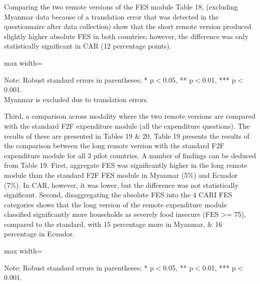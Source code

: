 \documentclass[11pt,harvard]{article}
\begin{document}
Comparing the two remote versions of the FES module Table 18, (excluding Myanmar data because of a translation error that was detected in the questionnaire after data collection) show that the short remote version produced slightly higher absolute FES in both countries; however, the difference was only statistically significant in CAR (12 percentage points).
	
	\begin{table}[htbp]
		\centering
		\begin{adjustbox}{max width=\textwidth}
			\begin{threeparttable}
				\caption{Impact of Module Length on Expenditure and FES in Remote Surveys}
				\scriptsize
				 
				\label{tab:FES_RM_Form_Length_ECU_CAR}
				\begin{tablenotes}
					\item Note: Robust standard errors in parentheses; * p$<$0.05, ** p$<$0.01, *** p$<$0.001. \\
					Myanmar is excluded due to translation errors.
				\end{tablenotes}
			\end{threeparttable}
		\end{adjustbox}
	\end{table}
	
Third, a comparison across modality where the two remote versions are compared with the standard F2F expenditure module (all the expenditure questions). The results of these are presented in Tables 19 \& 20. Table 19 presents the results of the comparison between the long remote version with the standard F2F expenditure module for all 3 pilot countries. A number of findings can be deduced from Table 19. First, aggregate FES was significantly higher in the long remote module than the standard F2F FES module in Myanmar (5\%) and Ecuador (7\%). In CAR, however,  it was lower, but the difference was not statistically significant. Second, disaggregating the absolute FES into the 4 CARI FES categories shows that the long version of the remote expenditure module classified significantly more households as severely food insecure (FES >= 75), compared to the standard, with 15 percentage more in Myanmar, \& 16 percentage in Ecuador. 
	
	\begin{table}[htbp]
		\centering
		\begin{adjustbox}{max width=\textwidth}
			\begin{threeparttable}
				\caption{Impact of Module Length on Expenditure and FES: F2F vs. Remote Long}
				\scriptsize
				 
				\label{tab:FES_F2F_Long_All_Country}
				\begin{tablenotes}
					\item Note: Robust standard errors in parentheses; * p$<$0.05, ** p$<$0.01, *** p$<$0.001. 
				\end{tablenotes}
			\end{threeparttable}
		\end{adjustbox}
	\end{table}
\end{document}
